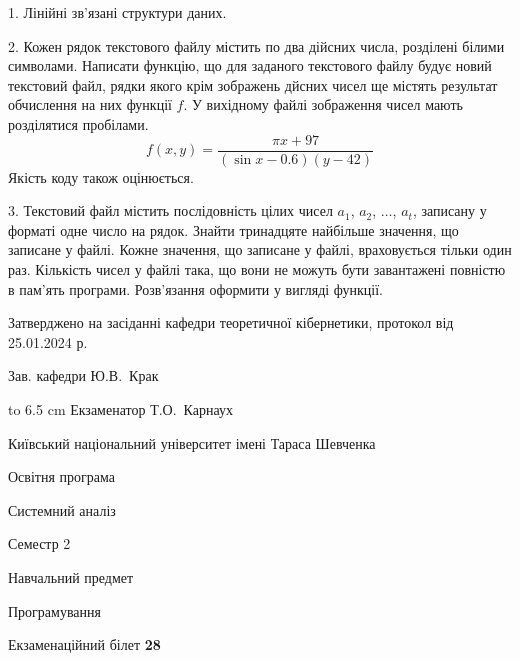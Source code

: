 \documentclass[12pt, ukrainian]{article}
\begin{document}
{%
1. Лінійні зв’язані структури даних.%
\par
\vspace{2mm}

2. Кожен рядок текстового файлу містить по два дійсних числа, розділені білими символами.
Написати функцію, що для заданого текстового файлу будує новий текстовий файл, рядки якого крім зображень дйсних чисел ще містять результат обчислення на них функції $f$. У вихідному файлі зображення чисел мають розділятися пробілами. 
$$f(x, y) =\frac{\pi x + 97}{(\sin x - 0.6) (y - 42)}$$ 
Якість коду також оцінюється.

\par
\vspace{2mm}

3. Текстовий файл містить послідовність цілих чисел $a_1$, $a_2$, $\ldots$, $a_t$, записану у форматі одне число на рядок. Знайти тринадцяте найбільше значення, що записане у файлі. Кожне значення, що записане у файлі, враховується тільки один раз. Кількість чисел у файлі така, що вони не можуть бути завантажені повністю в пам'ять програми. Розв'язання оформити у вигляді функції.

}
{\smallskip\smallskip \begin {scriptsize} Затверджено на засіданні кафедри теоретичної кібернетики, протокол   від   25.01.2024 р.\par\smallskip\smallskip\smallskip\smallskip
{\parbox {6.5 cm} {Зав. кафедри \dotfill Ю.В.~Крак}}\hspace {0.7cm} {\hbox to 6.5 cm { Екзаменатор \dotfill Т.О.~Карнаух}} \end{scriptsize}}
\vspace{0.9cm}
{{\begin {scriptsize}\par
{ \center  Київський національний університет імені Тараса Шевченка \par}
{\parbox {5 cm}{Освітня програма \hfill}{\parbox {7 cm}{Системний аналіз\hfill}}\parbox {6 cm}{\hfill Семестр 2}}\par
{\parbox {5 cm} {Навчальний предмет \hfill}\parbox {7 cm}{Програмування \hfill}\parbox {6cm}{\hfill}\par}\vspace{-15pt} \end{scriptsize}}{\center Екзаменаційний білет \No \textbf { 28 }\par}}
\end{document}
